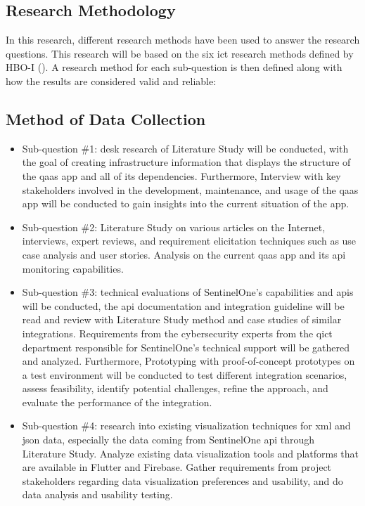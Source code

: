 \begin{multicols}{2}
      \section{Research Methodology}
      In this research, different research methods have been used to answer the research questions. This research
      will be based on the six \acrshort{ict} research methods defined by HBO-I (\cite{ictresearchmethods}). A
      research method for each sub-question is then defined along with how the results are considered valid and
      reliable:
      \subsection{Method of Data Collection}
      \begin{itemize}[label=-]
            \item Sub-question \#1: desk research of Literature Study will be conducted, with the goal of creating
                  infrastructure information that displays the structure of the \acrshort{qaas} app and all of its
                  dependencies. Furthermore, Interview with key stakeholders involved in the  development, maintenance,
                  and usage of the \acrshort{qaas} app will be conducted to gain insights into the current situation
                  of the app.
            \item Sub-question \#2: Literature Study on various articles on the Internet, interviews, expert reviews,
                  and requirement elicitation techniques such as use case analysis and user stories. Analysis on the
                  current \acrshort{qaas} app and its \acrshort{api} monitoring capabilities.
            \item Sub-question \#3: technical evaluations of SentinelOne's capabilities and \acrshort{api}s will
                  be conducted, the \acrshort{api} documentation and integration guideline will be read and review
                  with Literature Study method and case studies of similar integrations. Requirements from the
                  cybersecurity experts from the \acrshort{qict} department responsible for SentinelOne's technical
                  support will be gathered and analyzed. Furthermore, Prototyping with proof-of-concept prototypes
                  on a test environment will be conducted to test different integration scenarios, assess feasibility,
                  identify potential challenges, refine the approach, and evaluate the performance of the integration.
            \item Sub-question \#4: research into existing visualization techniques for \acrshort{xml} and
                  \acrshort{json} data, especially the data coming from SentinelOne \acrshort{api} through Literature
                  Study. Analyze existing data visualization tools and platforms that are available in Flutter and
                  Firebase. Gather requirements from project stakeholders regarding data visualization preferences and
                  usability, and do data analysis and usability testing.
      \end{itemize}

\end{multicols}
